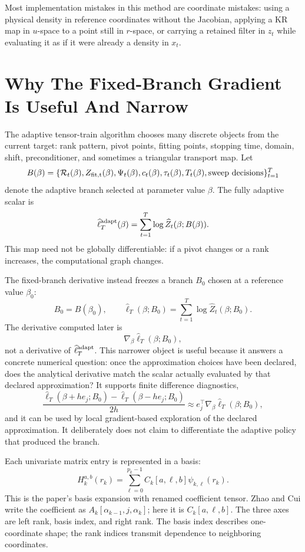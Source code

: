 \documentclass[11pt]{article}
\begin{document}
Most implementation mistakes in this method are coordinate mistakes: using a
physical density in reference coordinates without the Jacobian, applying a KR
map in \(u\)-space to a point still in \(r\)-space, or carrying a retained
filter in \(z_t\) while evaluating it as if it were already a density in
\(x_t\).

\section{Why The Fixed-Branch Gradient Is Useful And Narrow}

The adaptive tensor-train algorithm chooses many discrete objects from the
current target: rank pattern, pivot points, fitting points, stopping time,
domain, shift, preconditioner, and sometimes a triangular transport map.  Let
\[
    B(\beta)
    =
    \{\mathcal R_t(\beta),Z_{\rm fit,t}(\beta),\Psi_t(\beta),
      c_t(\beta),\tau_t(\beta),T_t(\beta),\text{sweep decisions}\}_{t=1}^T
    \label{eq:p24-branch-adaptive}
\]
denote the adaptive branch selected at parameter value \(\beta\).  The fully
adaptive scalar is
\[
    \widehat\ell_T^{\rm adapt}(\beta)
    =
    \sum_{t=1}^T
    \log \widehat Z_t(\beta;B(\beta)).
    \label{eq:p24-branch-adaptive-scalar}
\]
This map need not be globally differentiable: if a pivot changes or a rank
increases, the computational graph changes.

The fixed-branch derivative instead freezes a branch \(B_0\) chosen at a
reference value \(\beta_0\):
\[
    B_0=B(\beta_0),
    \qquad
    \widehat\ell_T(\beta;B_0)
    =
    \sum_{t=1}^T
    \log \widehat Z_t(\beta;B_0).
    \label{eq:p24-branch-fixed-scalar}
\]
The derivative computed later is
\[
    \nabla_\beta \widehat\ell_T(\beta;B_0),
    \label{eq:p24-branch-fixed-gradient}
\]
not a derivative of \(\widehat\ell_T^{\rm adapt}\).  This narrower object is
useful because it answers a concrete numerical question: once the approximation
choices have been declared, does the analytical derivative match the scalar
actually evaluated by that declared approximation?  It supports finite
difference diagnostics,
\[
    \frac{\widehat\ell_T(\beta+h e_j;B_0)
          -\widehat\ell_T(\beta-h e_j;B_0)}
         {2h}
    \approx
    e_j^\top\nabla_\beta\widehat\ell_T(\beta;B_0),
    \label{eq:p24-branch-fd}
\]
and it can be used by local gradient-based exploration of the declared
approximation.  It deliberately does not claim to differentiate the adaptive
policy that produced the branch.

Each univariate matrix entry is represented in a basis:
\[
    H_k^{a,b}(r_k)
    =
    \sum_{\ell=0}^{p_k-1}
    C_k[a,\ell,b]\psi_{k,\ell}(r_k).
    \label{eq:p24-tt-3}
\]
This is the paper's basis expansion with renamed coefficient tensor.  Zhao and Cui \cite{zhao2024ttsequential}
write the coefficient as \(A_k[\alpha_{k-1},j,\alpha_k]\); here it is
\(C_k[a,\ell,b]\).  The three axes are left rank, basis index, and right rank.
The basis index describes one-coordinate shape; the rank indices transmit
dependence to neighboring coordinates.
\end{document}
